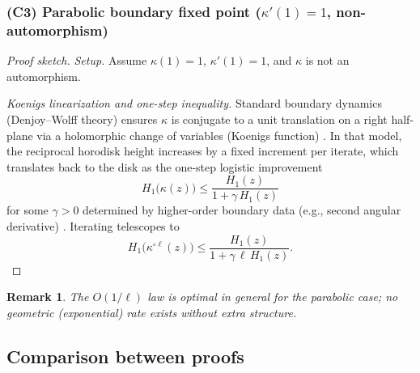 \documentclass[11pt]{article}
\newtheorem{remark}{Remark}
\begin{document}
\subsubsection{(C3) Parabolic boundary fixed point ($\kappa'(1)=1$, non-automorphism)}

\begin{proof}[Proof sketch]
\textit{Setup.} Assume $\kappa(1)=1$, $\kappa'(1)=1$, and $\kappa$ is not an automorphism.

\textit{Koenigs linearization and one-step inequality.}
Standard boundary dynamics (Denjoy–Wolff theory) ensures $\kappa$ is conjugate to a unit translation on a right half-plane via a holomorphic change of variables (Koenigs function) \cite{cowenmaccluer1995}. In that model, the reciprocal horodisk height increases by a fixed increment per iterate, which translates back to the disk as the one-step logistic improvement
\begin{equation}
H_1\big(\kappa(z)\big) \leq \frac{H_1(z)}{1+\gamma\,H_1(z)}
\end{equation}
for some $\gamma>0$ determined by higher-order boundary data (e.g., second angular derivative) \cite{mercer2018,osserman2000,unkelbach1938}. Iterating telescopes to
\begin{equation}
H_1\big(\kappa^{\circ \ell}(z)\big) \leq \frac{H_1(z)}{1+\gamma\,\ell\,H_1(z)}.
\end{equation}
\end{proof}

\begin{remark}
The $O(1/\ell)$ law is optimal in general for the parabolic case; no geometric (exponential) rate exists without extra structure.
\end{remark}

\subsection{Comparison between proofs}
\end{document}
